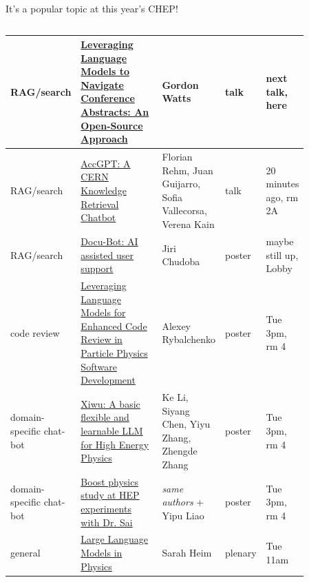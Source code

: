 \documentclass[aspectratio=169]{beamer}
\begin{document}
\begin{frame}{It's a popular topic at this year's CHEP!}
\small
\vspace{0.25 cm}
\begin{columns}
\renewcommand{\arraystretch}{1.04}
\begin{tabular}{C{0.15\linewidth} L{0.34\linewidth} L{0.18\linewidth} C{0.07\linewidth} C{0.12\linewidth}}
RAG/search & \textcolor{blue}{\href{https://indico.cern.ch/event/1338689/contributions/6011147/}{Leveraging Language Models to Navigate Conference Abstracts: An Open-Source Approach}} & Gordon Watts & talk & next talk, here \\\hline
RAG/search & \textcolor{blue}{\href{https://indico.cern.ch/event/1338689/contributions/6010661/}{AccGPT: A CERN Knowledge Retrieval Chatbot}} & Florian Rehm, Juan Guijarro, Sofia Vallecorsa, Verena Kain & talk & 20 minutes ago, rm 2A \\\hline
RAG/search & \textcolor{blue}{\href{https://indico.cern.ch/event/1338689/contributions/6010735/}{Docu-Bot: AI assisted user support}} & Jiri Chudoba & poster & maybe still up, Lobby \\\hline
code review & \textcolor{blue}{\href{https://indico.cern.ch/event/1338689/contributions/6010676/}{Leveraging Language Models for Enhanced Code Review in Particle Physics Software Development}} & Alexey Rybalchenko & poster & Tue 3pm, rm 4 \\\hline
domain-specific chat-bot & \textcolor{blue}{\href{https://indico.cern.ch/event/1338689/contributions/6010731/}{Xiwu: A basic flexible and learnable LLM for High Energy Physics}} & Ke Li, Siyang Chen, Yiyu Zhang, Zhengde Zhang & poster & Tue 3pm, rm 4 \\\hline
domain-specific chat-bot & \textcolor{blue}{\href{https://indico.cern.ch/event/1338689/contributions/6010732/}{Boost physics study at HEP experiments with Dr. Sai}} & {\it same authors} + Yipu Liao & poster & Tue 3pm, rm 4 \\\hline
general & \textcolor{blue}{\href{https://indico.cern.ch/event/1338689/contributions/6066662/}{Large Language Models in Physics}} & Sarah Heim & plenary & Tue 11am \\
\end{tabular}
\end{columns}
\end{frame}
\end{document}
